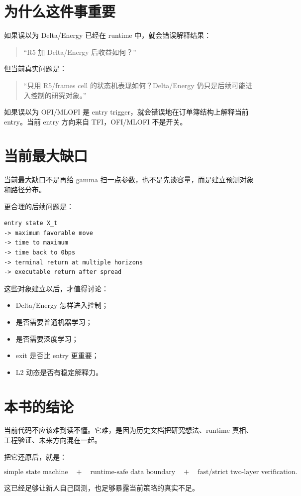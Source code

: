 
\section{为什么这件事重要}

如果误以为 Delta/Energy 已经在 runtime 中，就会错误解释结果：

\begin{quote}
“R5 加 Delta/Energy 后收益如何？”
\end{quote}

但当前真实问题是：

\begin{quote}
“只用 R5/frames cell 的状态机表现如何？Delta/Energy 仍只是后续可能进入控制的研究对象。”
\end{quote}

如果误以为 OFI/MLOFI 是 entry trigger，就会错误地在订单簿结构上解释当前 entry。当前 entry 方向来自 TFI，OFI/MLOFI 不是开关。

\section{当前最大缺口}

当前最大缺口不是再给 gamma 扫一点参数，也不是先谈容量，而是建立预测对象和路径分布。

更合理的后续问题是：

\begin{lstlisting}
entry state X_t
-> maximum favorable move
-> time to maximum
-> time back to 0bps
-> terminal return at multiple horizons
-> executable return after spread
\end{lstlisting}

这些对象建立以后，才值得讨论：

\begin{itemize}[leftmargin=2em]
  \item Delta/Energy 怎样进入控制；
  \item 是否需要普通机器学习；
  \item 是否需要深度学习；
  \item exit 是否比 entry 更重要；
  \item L2 动态是否有稳定解释力。
\end{itemize}

\section{本书的结论}

当前代码不应该难到读不懂。它难，是因为历史文档把研究想法、runtime 真相、工程验证、未来方向混在一起。

把它还原后，就是：

\[
\text{simple state machine}
\quad + \quad
\text{runtime-safe data boundary}
\quad + \quad
\text{fast/strict two-layer verification}.
\]

这已经足够让新人自己回测，也足够暴露当前策略的真实不足。

